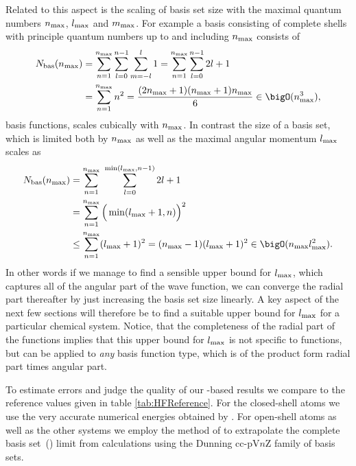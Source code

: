 Related to this aspect is the scaling of \CS basis set size
with the maximal quantum numbers $n_\text{max}$, $l_\text{max}$ and $m_\text{max}$.
For example a \CS basis consisting of complete shells with principle
quantum numbers up to and including $n_\text{max}$ consists of
\begin{equation}
	\begin{aligned}
	\Nbas(\nmax) &= \sum_{n=1}^{\nmax} \sum_{l=0}^{n-1} \sum_{m=-l}^l 1
		= \sum_{n=1}^{\nmax} \sum_{l=0}^{n-1} 2l+1 \\
		&= \sum_{n=1}^{\nmax} n^2
		= \frac{(2\nmax+1)(\nmax+1)\nmax}{6}
		\in \bigO(\nmax^3),
	\end{aligned}
	\label{eqn:NbasFullShellBasis}
\end{equation}
basis functions, \ie scales cubically with $n_\text{max}$.
In contrast the size of a basis set, which is limited both by $n_\text{max}$ as well as
the maximal angular momentum $l_\text{max}$ scales as
\begin{equation}
	\begin{aligned}
	\Nbas(\nmax) &= \sum_{n=1}^{\nmax} \ \sum_{l=0}^{\min(\lmax, n-1)} 2l + 1 \\
	&= \sum_{n=1}^{\nmax} \Big( \min(\lmax+1, n) \Big)^2 \\
	&\le \sum_{n=1}^{\nmax} (\lmax+1)^2 = (\nmax-1) (\lmax+1)^2
	\in \bigO(\nmax \lmax^2).
	\end{aligned}
	\label{eqn:NbasAmLimitedBasis}
\end{equation}
In other words if we manage to find a sensible upper bound for $l_\text{max}$,
which captures all of the angular part of the \HF wave function,
we can converge the radial part thereafter by just increasing the basis set size
linearly.
A key aspect of the next few sections will therefore be to find a suitable
upper bound for $l_\text{max}$ for a particular chemical system.
Notice, that the completeness of the radial part of the \CS functions
implies that this upper bound for $l_\text{max}$ is not specific to \CS functions,
but can be applied to \emph{any} basis function type,
which is of the product form radial part times angular part.

To estimate errors and judge the quality of our \CS-based \HF results
we compare to the reference values given in table \vref{tab:HFReference}.
For the closed-shell atoms we use the very accurate numerical \RHF energies
obtained by \citet{Morgon1997}.
For open-shell atoms as well as the other systems
we employ the method of \citet{Jensen2005} to extrapolate
the \UHF complete basis set~(\CBS) limit from
\UHF calculations using the Dunning cc-pV$n$Z family
of \cGTO basis sets.


